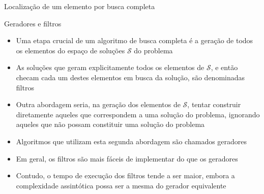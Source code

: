 \begin{frame}[fragile]{Localização de um elemento por busca completa}
\end{frame}

\begin{frame}[fragile]{Geradores e filtros}

    \begin{itemize}
        \item Uma etapa crucial de um algoritmo de busca completa é a geração de todos os elementos
            do espaço de soluções $\mathcal{S}$ do problema

        \item As soluções que geram explicitamente todos os elementos de $\mathcal{S}$, e 
            então checam cada um destes elementos em busca da solução, são denominadas filtros

        \item Outra abordagem seria, na geração dos elementos de $\mathcal{S}$, tentar construir diretamente
            aqueles que correspondem a uma solução do problema, ignorando aqueles que não
            possam constituir uma solução do problema

        \item Algoritmos que utilizam esta segunda abordagem são chamados geradores

        \item Em geral, os filtros são mais fáceis de implementar do que os geradores

        \item Contudo, o tempo de execução dos filtros tende a ser maior, embora a complexidade
            assintótica possa ser a mesma do gerador equivalente
    \end{itemize}

\end{frame}

